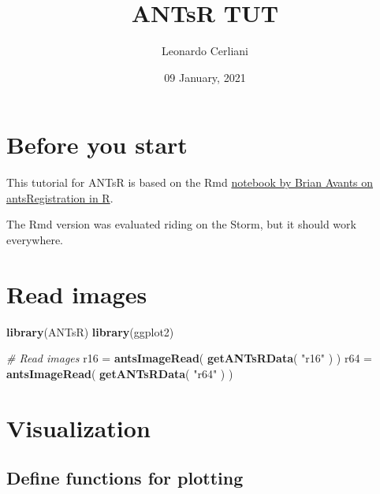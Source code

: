 \documentclass[]{tufte-handout}
\title{ANTsR TUT}
\author{Leonardo Cerliani}
\date{09 January, 2021}
\newenvironment{Shaded}{}{}
\newcommand{\CommentTok}[1]{\textcolor[rgb]{0.38,0.63,0.69}{\textit{#1}}}
\newcommand{\KeywordTok}[1]{\textcolor[rgb]{0.00,0.44,0.13}{\textbf{#1}}}
\newcommand{\NormalTok}[1]{#1}
\newcommand{\StringTok}[1]{\textcolor[rgb]{0.25,0.44,0.63}{#1}}
\begin{document}
\maketitle




\hypertarget{before-you-start}{%
\section{Before you start}\label{before-you-start}}

This tutorial for ANTsR is based on the Rmd
\href{https://github.com/stnava/ANTsTutorial/blob/master/registration/antsRegistrationIntro.Rmd}{notebook
by Brian Avants on antsRegistration in R}.

The Rmd version was evaluated riding on the Storm, but it should work
everywhere.

\hypertarget{read-images}{%
\section{Read images}\label{read-images}}

\begin{Shaded}
\begin{Highlighting}[]
\KeywordTok{library}\NormalTok{(ANTsR)}
\KeywordTok{library}\NormalTok{(ggplot2)}

\CommentTok{# Read images}
\NormalTok{r16 =}\StringTok{ }\KeywordTok{antsImageRead}\NormalTok{( }\KeywordTok{getANTsRData}\NormalTok{( }\StringTok{"r16"}\NormalTok{ ) )}
\NormalTok{r64 =}\StringTok{ }\KeywordTok{antsImageRead}\NormalTok{( }\KeywordTok{getANTsRData}\NormalTok{( }\StringTok{"r64"}\NormalTok{ ) )}
\end{Highlighting}
\end{Shaded}

\hypertarget{visualization}{%
\section{Visualization}\label{visualization}}

\hypertarget{define-functions-for-plotting}{%
\subsection{Define functions for
plotting}\label{define-functions-for-plotting}}
\end{document}
